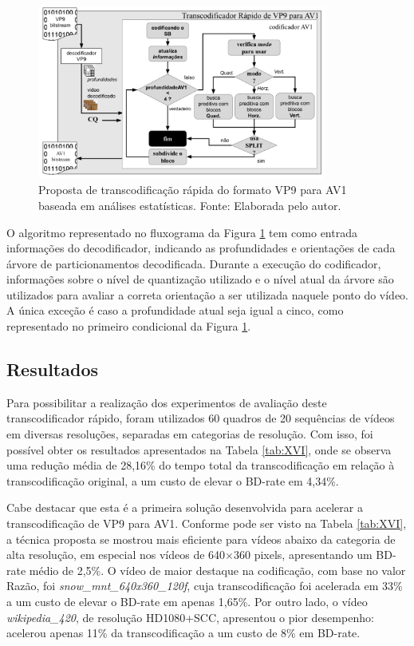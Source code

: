 \begin{figure}
    \centering
    \includegraphics[width=0.85\textwidth]{FIGURES/fig_24.png}
    \caption{Proposta de transcodificação rápida do formato VP9 para AV1 baseada em análises estatísticas. Fonte: Elaborada pelo autor.}
    \label{fig:24}
\end{figure}

O algoritmo representado no fluxograma da Figura \ref{fig:24} tem como entrada informações do decodificador, indicando as profundidades e orientações de cada árvore de particionamentos decodificada. Durante a execução do codificador, informações sobre o nível de quantização utilizado e o nível atual da árvore são utilizados para avaliar a correta orientação a ser utilizada naquele ponto do vídeo. A única exceção é caso a profundidade atual seja igual a cinco, como representado no primeiro condicional da Figura \ref{fig:24}. 

\subsection{Resultados}
\label{cap:6.2.2}

Para possibilitar a realização dos experimentos de avaliação deste transcodificador rápido, foram utilizados 60 quadros de 20 sequências de vídeos em diversas resoluções, separadas em categorias de resolução. Com isso, foi possível obter os resultados apresentados na Tabela \ref{tab:XVI}, onde se observa uma redução média de 28,16\% do tempo total da transcodificação em relação à transcodificação original, a um custo de elevar o BD-rate em 4,34\%.



Cabe destacar que esta é a primeira solução desenvolvida para acelerar a transcodificação de VP9 para AV1. Conforme pode ser visto na Tabela \ref{tab:XVI}, a técnica proposta se mostrou mais eficiente para vídeos abaixo da categoria de alta resolução, em especial nos vídeos de 640$\times$360 pixels, apresentando um BD-rate médio de 2,5\%. O vídeo de maior destaque na codificação, com base no valor Razão, foi \textit{snow\_mnt\_640x360\_120f}, cuja transcodificação foi acelerada em 33\% a um custo de elevar o BD-rate em apenas 1,65\%. Por outro lado, o vídeo \textit{wikipedia\_420}, de resolução HD1080+SCC, apresentou o pior desempenho: acelerou apenas 11\% da transcodificação a um custo de 8\% em BD-rate. 
